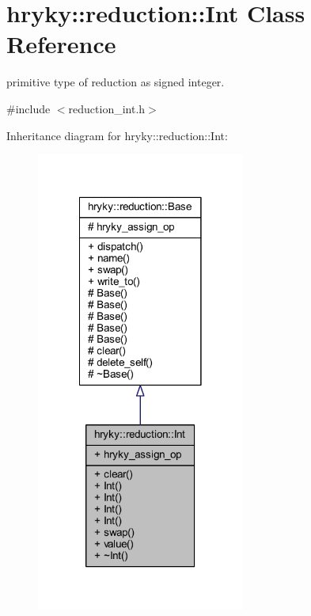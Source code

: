 \hypertarget{classhryky_1_1reduction_1_1_int}{\section{hryky\-:\-:reduction\-:\-:Int Class Reference}
\label{classhryky_1_1reduction_1_1_int}
}


primitive type of reduction as signed integer.  




{\ttfamily \#include $<$reduction\-\_\-int.\-h$>$}



Inheritance diagram for hryky\-:\-:reduction\-:\-:Int\-:
\nopagebreak
\begin{figure}[H]
\begin{center}
\leavevmode
\includegraphics[width=194pt]{classhryky_1_1reduction_1_1_int__inherit__graph}
\end{center}
\end{figure}
